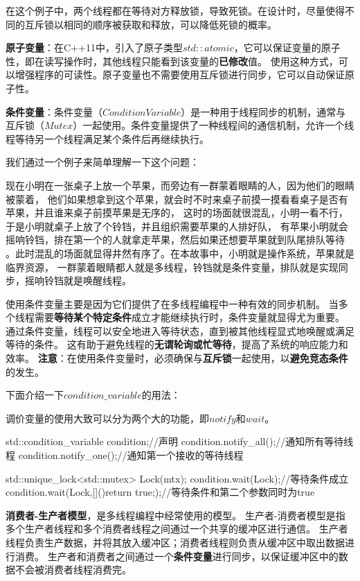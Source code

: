 在这个例子中，两个线程都在等待对方释放锁，导致死锁。在设计时，尽量使得不同的互斥锁以相同的顺序被获取和释放，可以降低死锁的概率。

\textbf{原子变量}：在C++11中，引入了原子类型$std::atomic$，它可以保证变量的原子性，即在读写操作时，其他线程只能看到该变量的\textbf{已修改}值。
使用这种方式，可以增强程序的可读性。原子变量也不需要使用互斥锁进行同步，它可以自动保证原子性。

\textbf{条件变量}：条件变量（$Condition Variable$）是一种用于线程同步的机制，通常与互斥锁（$Mutex$）一起使用。条件变量提供了一种线程间的通信机制，允许一个线程等待另一个线程满足某个条件后再继续执行。

我们通过一个例子来简单理解一下这个问题：

现在小明在一张桌子上放一个苹果，而旁边有一群蒙着眼睛的人，因为他们的眼睛被蒙着，
他们如果想拿到这个苹果，就会时不时来桌子前摸一摸看看桌子是否有苹果，并且谁来桌子前摸苹果是无序的，
这时的场面就很混乱，小明一看不行，于是小明就桌子上放了个铃铛，并且组织需要苹果的人排好队，
有苹果小明就会摇响铃铛，排在第一个的人就拿走苹果，然后如果还想要苹果就到队尾排队等待
。此时混乱的场面就显得井然有序了。在本故事中，小明就是操作系统，苹果就是临界资源，
一群蒙着眼睛都人就是多线程，铃铛就是条件变量，排队就是实现同步，摇响铃铛就是唤醒线程。

使用条件变量主要是因为它们提供了在多线程编程中一种有效的同步机制。
当多个线程需要\textbf{等待某个特定条件}成立才能继续执行时，条件变量就显得尤为重要。
通过条件变量，线程可以安全地进入等待状态，直到被其他线程显式地唤醒或满足等待的条件。
这有助于避免线程的\textbf{无谓轮询或忙等待}，提高了系统的响应能力和效率。
\textbf{注意}：在使用条件变量时，必须确保与\textbf{互斥锁}一起使用，以\textbf{避免竞态条件}的发生。

下面介绍一下$condition\_variable$的用法：

调价变量的使用大致可以分为两个大的功能，即$notify$和$wait$。

\begin{tcode}
std::condition_variable condition;//声明
condition.notify_all();//通知所有等待线程
condition.notify_one();//通知第一个接收的等待线程

std::unique_lock<std::mutex> Lock(mtx);
condition.wait(Lock);//等待条件成立
condition.wait(Lock,[](){return true;});//等待条件和第二个参数同时为true
\end{tcode}

\textbf{消费者-生产者模型}，是多线程编程中经常使用的模型。
生产者-消费者模型是指多个生产者线程和多个消费者线程之间通过一个共享的缓冲区进行通信。
生产者线程负责生产数据，并将其放入缓冲区；消费者线程则负责从缓冲区中取出数据进行消费。
生产者和消费者之间通过一个\textbf{条件变量}进行同步，以保证缓冲区中的数据不会被消费者线程消费完。


